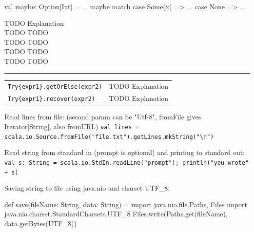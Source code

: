 \documentclass[article, a5paper]{memoir}
\newcommand{\LangColor}{red}
\newcommand{\head}[1]{{\bfseries {\color{\LangColor}{#1}}\par\vspace{1mm}\hrule\vspace{-2mm}}}
\renewcommand{\arraystretch}{0.9}
\newcommand{\code}{\lstinline[basicstyle=\ttfamily]}
\newcommand{\Newline}{\vspace{\baselineskip}}
\begin{document}
\vspace{0.5em}\head{Option, Some, None}\vspace{0.5em}
\begin{minipage}{0.3\linewidth}%
{\small
\begin{Code}
val maybe: Option[Int] = ...
maybe match {
  case Some(x) => ...
  case None    => ...
}
\end{Code}
}%
\end{minipage}%
\begin{minipage}{0.3\linewidth}
{\hfill\raggedleft\small
TODO Explanation \\
TODO TODO \\
TODO TODO \\
TODO TODO \\
TODO TODO \\
}%
\end{minipage}

\head{scala.util.Try}\Newline
{\small\renewcommand{\arraystretch}{1.1}
\begin{tabular}{@{}l l}
\code|Try{expr1}.getOrElse(expr2)| & TODO Explanation \\
\code|Try{expr1}.recover(expr2)| & TODO Explanation \\
\end{tabular}
}

\vspace{0.5em}\head{scala.concurrent.Future}\Newline



\Newline\head{Reading/writing from file and standard in/out:}\Newline
{\small
Read lines from file: (second param can be "Utf-8", fromFile gives Iterator[String], also fromURL)
\code|val lines = scala.io.Source.fromFile("file.txt").getLines.mkString("\n")| 
}


{\small
\vspace{0.5em}Read string from standard in (prompt is optional) and printing to standard out:
\code|val s: String = scala.io.StdIn.readLine("prompt"); println("you wrote" + s)|

\vspace{0.5em}Saving string to file using java.nio and charset UTF\_8:\vspace{-0.5em}
\begin{Code}
def save(fileName: String, data: String) = {
    import java.nio.file.{Paths, Files}
    import java.nio.charset.StandardCharsets.UTF_8
    Files.write(Paths.get(fileName), data.getBytes(UTF_8))
}
\end{Code}
}
\end{document}
